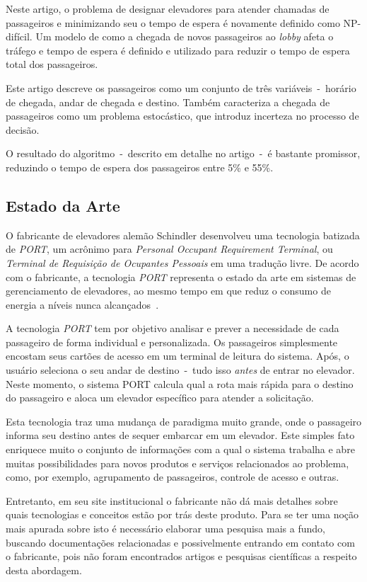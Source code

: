 Neste artigo, o problema de designar elevadores para atender chamadas de
passageiros e minimizando seu o tempo de espera é novamente definido como
NP-difícil. Um modelo de como a chegada de novos passageiros ao \textit{lobby}
afeta o tráfego e tempo de espera é definido e utilizado para reduzir o tempo de
espera total dos passageiros.

Este artigo descreve os passageiros como um conjunto de três variáveis~-~horário
de chegada, andar de chegada e destino. Também caracteriza a chegada de
passageiros como um problema estocástico, que introduz incerteza no processo de
decisão.

O resultado do algoritmo~-~descrito em detalhe no artigo~-~é bastante
promissor, reduzindo o tempo de espera dos passageiros entre 5\% e 55\%.

\subsection{\label{section:art}Estado da Arte}

O fabricante de elevadores alemão Schindler desenvolveu uma tecnologia batizada
de \textit{PORT}, um acrônimo para \textit{Personal Occupant Requirement
Terminal}, ou \textit{Terminal de Requisição de Ocupantes Pessoais} em uma
tradução livre. De acordo com o fabricante, a tecnologia \textit{PORT}
representa o estado da arte em sistemas de gerenciamento de elevadores, ao mesmo
tempo em que reduz o consumo de energia a níveis nunca
alcançados~\cite{Schindler14}.

A tecnologia \textit{PORT} tem por objetivo analisar e prever a necessidade de
cada passageiro de forma individual e personalizada. Os passageiros simplesmente
encostam seus cartões de acesso em um terminal de leitura do sistema. Após, o
usuário seleciona o seu andar de destino~-~tudo isso \textit{antes} de entrar no
elevador. Neste momento, o sistema PORT calcula qual a rota mais rápida para o
destino do passageiro e aloca um elevador específico para atender a solicitação.

Esta tecnologia traz uma mudança de paradigma muito grande, onde o passageiro
informa seu destino antes de sequer embarcar em um elevador. Este simples fato
enriquece muito o conjunto de informações com a qual o sistema trabalha e abre
muitas possibilidades para novos produtos e serviços relacionados ao problema,
como, por exemplo, agrupamento de passageiros, controle de acesso e outras.

Entretanto, em seu site institucional o fabricante não dá mais detalhes sobre
quais tecnologias e conceitos estão por trás deste produto. Para se ter uma
noção mais apurada sobre isto é necessário elaborar uma pesquisa mais a fundo,
buscando documentações relacionadas e possivelmente entrando em contato com o
fabricante, pois não foram encontrados artigos e pesquisas científicas a
respeito desta abordagem.